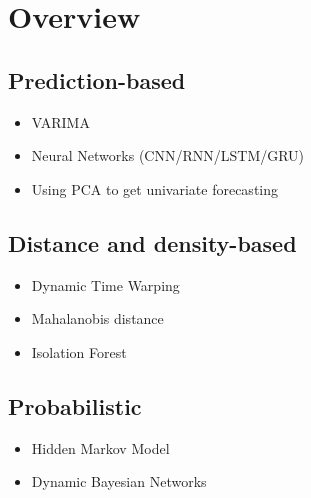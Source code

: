 

\section*{Overview}

\subsection{Prediction-based}

\begin{itemize}
    \item VARIMA %
    \item Neural Networks (CNN/RNN/LSTM/GRU)
    \item Using PCA to get univariate forecasting %

\end{itemize}

\subsection{Distance and density-based}
\begin{itemize}
  
    \item Dynamic Time Warping %
    \item Mahalanobis distance %
    \item Isolation Forest %
\end{itemize}

\subsection{Probabilistic}

\begin{itemize}
    \item Hidden Markov Model %
    \item Dynamic Bayesian Networks

\end{itemize}
